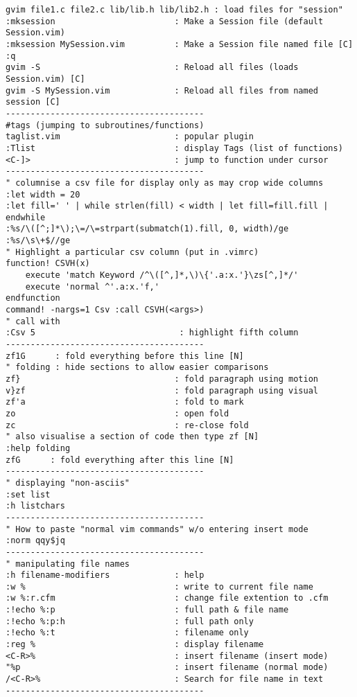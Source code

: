 \documentclass[10pt,landscape]{article}
\begin{document}
\begin{multicols}{2}
\begin{verbatim}
gvim file1.c file2.c lib/lib.h lib/lib2.h : load files for "session"
:mksession                        : Make a Session file (default Session.vim)
:mksession MySession.vim          : Make a Session file named file [C]
:q
gvim -S                           : Reload all files (loads Session.vim) [C]
gvim -S MySession.vim             : Reload all files from named session [C]
----------------------------------------
#tags (jumping to subroutines/functions)
taglist.vim                       : popular plugin
:Tlist                            : display Tags (list of functions)
<C-]>                             : jump to function under cursor
----------------------------------------
" columnise a csv file for display only as may crop wide columns
:let width = 20
:let fill=' ' | while strlen(fill) < width | let fill=fill.fill | endwhile
:%s/\([^;]*\);\=/\=strpart(submatch(1).fill, 0, width)/ge
:%s/\s\+$//ge
" Highlight a particular csv column (put in .vimrc)
function! CSVH(x)
    execute 'match Keyword /^\([^,]*,\)\{'.a:x.'}\zs[^,]*/'
    execute 'normal ^'.a:x.'f,'
endfunction
command! -nargs=1 Csv :call CSVH(<args>)
" call with
:Csv 5                             : highlight fifth column
----------------------------------------
zf1G      : fold everything before this line [N]
" folding : hide sections to allow easier comparisons
zf}                               : fold paragraph using motion
v}zf                              : fold paragraph using visual
zf'a                              : fold to mark
zo                                : open fold
zc                                : re-close fold
" also visualise a section of code then type zf [N]
:help folding
zfG      : fold everything after this line [N]
----------------------------------------
" displaying "non-asciis"
:set list
:h listchars
----------------------------------------
" How to paste "normal vim commands" w/o entering insert mode
:norm qqy$jq
----------------------------------------
" manipulating file names
:h filename-modifiers             : help
:w %                              : write to current file name
:w %:r.cfm                        : change file extention to .cfm
:!echo %:p                        : full path & file name
:!echo %:p:h                      : full path only
:!echo %:t                        : filename only
:reg %                            : display filename
<C-R>%                            : insert filename (insert mode)
"%p                               : insert filename (normal mode)
/<C-R>%                           : Search for file name in text
----------------------------------------

\end{verbatim}
\end{multicols}
\end{document}
